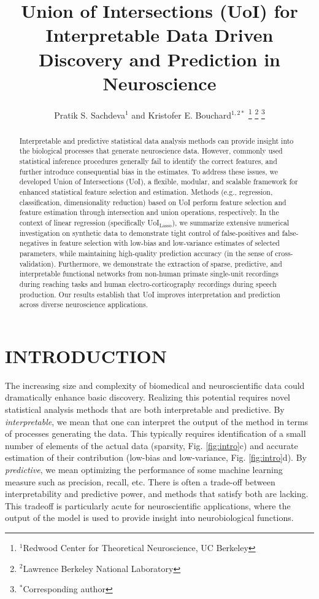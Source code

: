 \documentclass[letterpaper, 10 pt, conference]{ieeeconf}  %
\title{\LARGE \bf
Union of Intersections (UoI) for Interpretable Data Driven Discovery and Prediction in Neuroscience
}
\author{
    Pratik S. Sachdeva$^{1}$ and Kristofer E. Bouchard$^{1,2*}$%
    \thanks{
        $^{1}$Redwood Center for Theoretical Neuroscience, UC Berkeley
    }%
    \thanks{
        $^{2}$Lawrence Berkeley National Laboratory
    }%
    \thanks{
        $^*$Corresponding author
    }%
}
\begin{document}
\maketitle
\thispagestyle{empty}
\pagestyle{empty}


\begin{abstract}

Interpretable and predictive statistical data analysis methods can provide insight into the biological processes that generate neuroscience data.  However, commonly used statistical inference procedures generally fail to identify the correct features, and further introduce consequential bias in the estimates. To address these issues, we developed Union of Intersections (UoI), a flexible, modular, and scalable framework for enhanced statistical feature selection and estimation. Methods (e.g., regression, classification, dimensionality reduction) based on UoI perform feature selection and feature estimation through intersection and union operations, respectively. In the context of linear regression (specifically UoI$_{\text{Lasso}}$), we summarize extensive numerical investigation on synthetic data to demonstrate tight control of false-positives and false-negatives in feature selection with low-bias and low-variance estimates of selected parameters, while maintaining high-quality prediction accuracy (in the sense of cross-validation). Furthermore, we demonstrate the extraction of sparse, predictive, and interpretable functional networks from non-human primate single-unit recordings during reaching tasks and human electro-corticography recordings during speech production. Our results establish that UoI improves interpretation and prediction across diverse neuroscience applications. 

\end{abstract}


\section{INTRODUCTION}
The increasing size and complexity of biomedical and neuroscientific data could dramatically enhance basic discovery. Realizing this potential requires novel statistical analysis methods that are both interpretable and predictive. By \textit{interpretable}, we mean that one can interpret the output of the method in terms of processes generating the data. This typically requires identification of a small number of elements of the actual data (sparsity, Fig. \ref{fig:intro}c) and accurate estimation of their contribution (low-bias and low-variance, Fig. \ref{fig:intro}d). By \textit{predictive}, we mean optimizing the performance of some machine learning measure such as precision, recall, etc. There is often a trade-off between interpretability and predictive power, and methods that satisfy both are lacking. This tradeoff is particularly acute for neuroscientific applications, where the output of the model is used to provide insight into neurobiological functions. 
\end{document}
